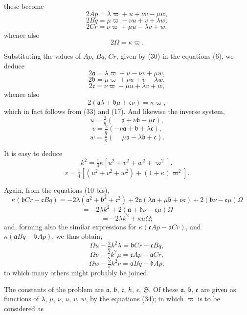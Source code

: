\documentclass[11pt]{article}
\begin{document}
these become
\[
2Ap = \lambda\varpi + u + \nu v - \mu w, \tag{32}
\]
\[
2Bq = \mu\varpi - \nu u + v + \lambda w,
\]
\[
2Cr = \nu\varpi + \mu u - \lambda v + w,
\]
whence also
\[
2\Omega = \kappa\varpi. \tag{33}
\]

Substituting the values of $Ap$, $Bq$, $Cr$, given by (30) in the equations (6), we deduce
\[
2\mathfrak{a} = \lambda\varpi + u - \nu v + \mu w, \tag{34}
\]
\[
2\mathfrak{b} = \mu\varpi + \nu u + v - \lambda w,
\]
\[
2\mathfrak{c} = \nu\varpi - \mu u + \lambda v + w,
\]
whence also
\[
2(\mathfrak{a}\lambda + \mathfrak{b}\mu + \mathfrak{c}\nu) = \kappa\varpi, \tag{35}
\]
which in fact follows from (33) and (17). And likewise the inverse system,
\[
u = \tfrac{2}{\kappa}(\phantom{-}\mathfrak{a} + \nu\mathfrak{b} - \mu\mathfrak{c}), \tag{36}
\]
\[
v = \tfrac{2}{\kappa}(-\nu\mathfrak{a} + \mathfrak{b} + \lambda\mathfrak{c}),
\]
\[
w = \tfrac{2}{\kappa}(\phantom{-}\mu\mathfrak{a} - \lambda\mathfrak{b} + \mathfrak{c}).
\]

It is easy to deduce
\[
k^2 = \tfrac{1}{4}\kappa[u^2 + v^2 + w^2 + \varpi^2], \tag{37}
\]
\[
v = \tfrac{1}{4}[(u^2 + v^2 + w^2) + (1 + \kappa)\varpi^2]. \tag{38}
\]

Again, from the equations (10 bis),
\[
\kappa(\mathfrak{b}Cr - \mathfrak{c}Bq) = -2\lambda(\mathfrak{a}^2 + \mathfrak{b}^2 + \mathfrak{c}^2) + 2\mathfrak{a}(\lambda\mathfrak{a} + \mu\mathfrak{b} + \nu\mathfrak{c}) + 2(\mathfrak{b}\nu - \mathfrak{c}\mu)\Omega
\]
\[
= -2\lambda k^2 + 2(\mathfrak{a} + \mathfrak{b}\nu - \mathfrak{c}\mu)\Omega
\]
\[
= -2\lambda k^2 + \kappa u\Omega;
\]
and, forming also the similar expressions for $\kappa(\mathfrak{c}Ap - \mathfrak{a}Cr)$, and $\kappa(\mathfrak{a}Bq - \mathfrak{b}Ap)$, we thus obtain,
\[
\Omega u - \tfrac{2}{\kappa}k^2\lambda = \mathfrak{b}Cr - \mathfrak{c}Bq, \tag{39}
\]
\[
\Omega v - \tfrac{2}{\kappa}k^2\mu = \mathfrak{c}Ap - \mathfrak{a}Cr,
\]
\[
\Omega w - \tfrac{2}{\kappa}k^2\nu = \mathfrak{a}Bq - \mathfrak{b}Ap;
\]
to which many others might probably be joined.

The constants of the problem are $\mathfrak{a}$, $\mathfrak{b}$, $\mathfrak{c}$, $h$, $\epsilon$, $\mathfrak{S}$. Of these $\mathfrak{a}$, $\mathfrak{b}$, $\mathfrak{c}$ are given as functions of $\lambda$, $\mu$, $\nu$, $u$, $v$, $w$, by the equations (34); in which $\varpi$ is to be considered as

\newpage
\setcounter{page}{245}
\end{document}
